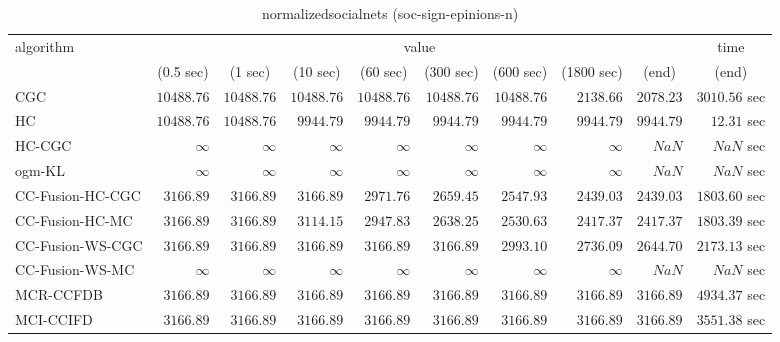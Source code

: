 \begin{table}[H]
\scriptsize
\centering
\caption{normalizedsocialnets (soc-sign-epinions-n)}
\label{tab:anytimetable-normalizedsocialnets-soc-sign-epinions-n}
\begin{tabular}{lrrrrrrrrr}
\toprule
           algorithm &                                   \multicolumn{8}{c}{value} & \multicolumn{1}{c}{time}   \\  
\cmidrule(lr){2-9}\cmidrule(lr){10-10}   
                     & \multicolumn{1}{c}{(0.5 sec)} & \multicolumn{1}{c}{(1 sec)} & \multicolumn{1}{c}{(10 sec)} & \multicolumn{1}{c}{(60 sec)} & \multicolumn{1}{c}{(300 sec)} & \multicolumn{1}{c}{(600 sec)} & \multicolumn{1}{c}{(1800 sec)} & \multicolumn{1}{c}{(end)} & \multicolumn{1}{c}{(end)}   \\ \midrule 
                 CGC & $     10488.76$ & $     10488.76$ & $     10488.76$ & $     10488.76$ & $     10488.76$ & $     10488.76$ & $      2138.66$ & $      2078.23$ & $      3010.56$ sec   \\ 
                  HC & $     10488.76$ & $     10488.76$ & $      9944.79$ & $      9944.79$ & $      9944.79$ & $      9944.79$ & $      9944.79$ & $      9944.79$ & $        12.31$ sec   \\ 
              HC-CGC & $\infty$ & $\infty$ & $\infty$ & $\infty$ & $\infty$ & $\infty$ & $\infty$ & $          NaN$ & $          NaN$ sec   \\ 
              ogm-KL & $\infty$ & $\infty$ & $\infty$ & $\infty$ & $\infty$ & $\infty$ & $\infty$ & $          NaN$ & $          NaN$ sec   \\ 
    CC-Fusion-HC-CGC & $      3166.89$ & $      3166.89$ & $      3166.89$ & $      2971.76$ & $      2659.45$ & $      2547.93$ & $      2439.03$ & $      2439.03$ & $      1803.60$ sec   \\ 
     CC-Fusion-HC-MC & $      3166.89$ & $      3166.89$ & $      3114.15$ & $      2947.83$ & $      2638.25$ & $      2530.63$ & $      2417.37$ & $      2417.37$ & $      1803.39$ sec   \\ 
    CC-Fusion-WS-CGC & $      3166.89$ & $      3166.89$ & $      3166.89$ & $      3166.89$ & $      3166.89$ & $      2993.10$ & $      2736.09$ & $      2644.70$ & $      2173.13$ sec   \\ 
     CC-Fusion-WS-MC & $\infty$ & $\infty$ & $\infty$ & $\infty$ & $\infty$ & $\infty$ & $\infty$ & $          NaN$ & $          NaN$ sec   \\ 
\cmidrule{1-1} 
           MCR-CCFDB & $      3166.89$ & $      3166.89$ & $      3166.89$ & $      3166.89$ & $      3166.89$ & $      3166.89$ & $      3166.89$ & $      3166.89$ & $      4934.37$ sec   \\ 
\cmidrule{1-1} 
           MCI-CCIFD & $      3166.89$ & $      3166.89$ & $      3166.89$ & $      3166.89$ & $      3166.89$ & $      3166.89$ & $      3166.89$ & $      3166.89$ & $      3551.38$ sec   \\ 
\bottomrule
\end{tabular}
\end{table}

